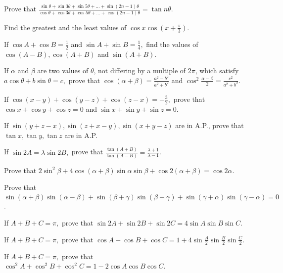 \item Prove that $\frac{\sin\theta + \sin 3\theta + \sin 5\theta + \ldots + \sin(2n - 1)\theta}{\cos\theta + \cos 3\theta +
    \cos 5\theta + \ldots + \cos(2n - 1)\theta} = \tan n\theta$.

\item Find the greatest and the least values of $\cos x\cos\left(x + \frac{\pi}{3}\right)$.

\item If $\cos A + \cos B = \frac{1}{2}$ and $\sin A + \sin B = \frac{1}{4},$ find the values of $\cos(A - B), \cos(A + B)$
    and $\sin(A + B)$.

\item If $\alpha$ and $\beta$ are two values of $\theta$, not differing by a multiple of $2\pi$, which satisfy $a\cos\theta +
    b\sin\theta = c,$ prove that $\cos(\alpha + \beta) = \frac{a^2 - b^2}{a^2 + b^2}$ and $\cos^2\frac{\alpha - \beta}{2} =
    \frac{c^2}{a^2 + b^2}$.

\item If $\cos(x - y) + \cos(y - z) + \cos(z - x) = -\frac{3}{2},$ prove that $\cos x + \cos y + \cos z = 0$ and $\sin x +
    \sin y + \sin z = 0$.

\item If $\sin(y + z - x), \sin(z + x - y), \sin(x + y - z)$ are in A.P., prove that $\tan x, \tan y, \tan z$ are in A.P.

\item If $\sin 2A = \lambda\sin 2B,$ prove that $\frac{\tan(A + B)}{\tan(A - B)} = \frac{\lambda + 1}{\lambda - 1}$.

\item Prove that $2\sin^2\beta + 4\cos(\alpha + \beta)\sin\alpha\sin\beta + \cos 2(\alpha + \beta) = \cos 2\alpha$.

\item Prove that $\sin(\alpha + \beta)\sin(\alpha - \beta) + \sin(\beta + \gamma)\sin(\beta - \gamma) + \sin(\gamma +
    \alpha)\sin(\gamma - \alpha) = 0$.

\item If $A + B + C = \pi,$ prove that $\sin 2A + \sin 2B + \sin 2C = 4\sin A\sin B\sin C$.

\item If $A + B + C = \pi,$ prove that $\cos A + \cos B + \cos C = 1 + 4\sin\frac{A}{2}\sin\frac{B}{2}\sin\frac{C}{2}$.

\item If $A + B + C = \pi,$ prove that $\cos^2 A + \cos^2 B + \cos^2 C = 1 - 2\cos A\cos B\cos C$.

